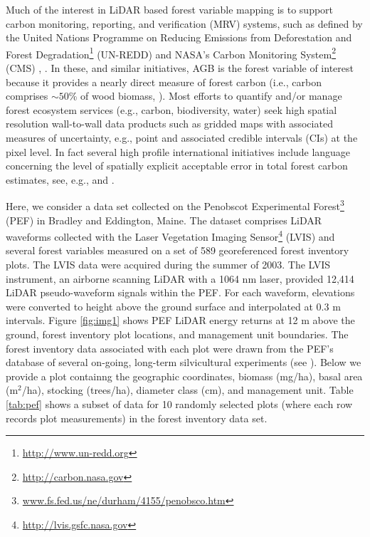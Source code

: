 \documentclass[]{krantz}
\renewcommand{\href}[2]{#2\footnote{\url{#1}}}
\begin{document}
Much of the interest in LiDAR based forest variable mapping is to support carbon monitoring, reporting, and verification (MRV) systems, such as defined by the United Nations Programme on \href{http://www.un-redd.org}{Reducing Emissions from Deforestation and Forest Degradation} (UN-REDD) and NASA's \href{http://carbon.nasa.gov}{Carbon Monitoring System} (CMS) \citep{le2011}, \citep{ometto2014}. In these, and similar initiatives, AGB is the forest variable of interest because it provides a nearly direct measure of forest carbon (i.e., carbon comprises \(\sim 50\)\% of wood biomass, \citet{west2004}). Most efforts to quantify and/or manage forest ecosystem services (e.g., carbon, biodiversity, water) seek high spatial resolution wall-to-wall data products such as gridded maps with associated measures of uncertainty, e.g., point and associated credible intervals (CIs) at the pixel level. In fact several high profile international initiatives include language concerning the level of spatially explicit acceptable error in total forest carbon estimates, see, e.g., \citet{REDD2009} and \citet{UNFCCC2015}.

Here, we consider a data set collected on the \href{www.fs.fed.us/ne/durham/4155/penobsco.htm}{Penobscot Experimental Forest} (PEF) in Bradley and Eddington, Maine. The dataset comprises LiDAR waveforms collected with the \href{http://lvis.gsfc.nasa.gov}{Laser Vegetation Imaging Sensor} (LVIS) and several forest variables measured on a set of 589 georeferenced forest inventory plots. The LVIS data were acquired during the summer of 2003. The LVIS instrument, an airborne scanning LiDAR with a 1064 nm laser, provided 12,414 LiDAR pseudo-waveform signals within the PEF. For each waveform, elevations were converted to height above the ground surface and interpolated at 0.3 m intervals. Figure \ref{fig:img1} shows PEF LiDAR energy returns at 12 m above the ground, forest inventory plot locations, and management unit boundaries. The forest inventory data associated with each plot were drawn from the PEF's database of several on-going, long-term silvicultural experiments (see \citet{Kenefic2015}). Below we provide a plot containng the geographic coordinates, biomass (mg/ha), basal area (m\(^2\)/ha), stocking (trees/ha), diameter class (cm), and management unit. Table \ref{tab:pef} shows a subset of data for 10 randomly selected plots (where each row records plot measurements) in the forest inventory data set.
\end{document}
